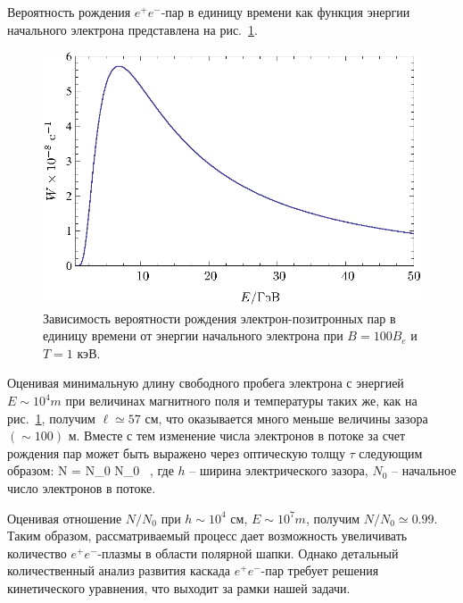 Вероятность рождения $e^+e^-$-пар в единицу времени как функция 
энергии начального  электрона 
представлена на рис.~\ref{fig:prob}. 


%
\begin{figure}[h]
\centerline{\includegraphics[width=14cm]{fig5_5.eps}}
\caption{Зависимость вероятности рождения электрон-позитронных пар в единицу времени от энергии 
начального электрона  при $B=100B_e$ и $T=1$ кэВ.}
\label{fig:prob}
\end{figure}

Оценивая минимальную длину свободного пробега электрона 
с энергией $E \sim 10^{4} m$ при величинах  
магнитного поля и температуры таких же, как на рис.~\ref{fig:prob}, получим 
$\ell \simeq 57$ см, что 
оказывается много меньше величины зазора $(\sim 100)$ м.  
Вместе с тем изменение числа электронов в потоке за счет рождения пар может быть 
выражено через оптическую толщу $\tau$ следующим образом: 
%
\beq
\label{eq:tau}
N = N_0 \exp{[-\tau]} \simeq N_0  \, , 
\eeq
\noindent где  $h$ -- ширина электрического зазора, 
$N_0$ -- начальное число электронов в потоке.

Оценивая отношение $N/N_0$ при $h \sim 10^4$ см, $E \sim 10^{7} m$, 
получим $N/N_0 \simeq 0.99$. Таким образом, рассматриваемый 
процесс дает возможность  увеличивать количество $e^+e^-$-плазмы в области 
полярной шапки. Однако детальный количественный анализ 
развития каскада  $e^+e^-$-пар требует 
решения кинетического уравнения, что выходит за рамки нашей задачи.

